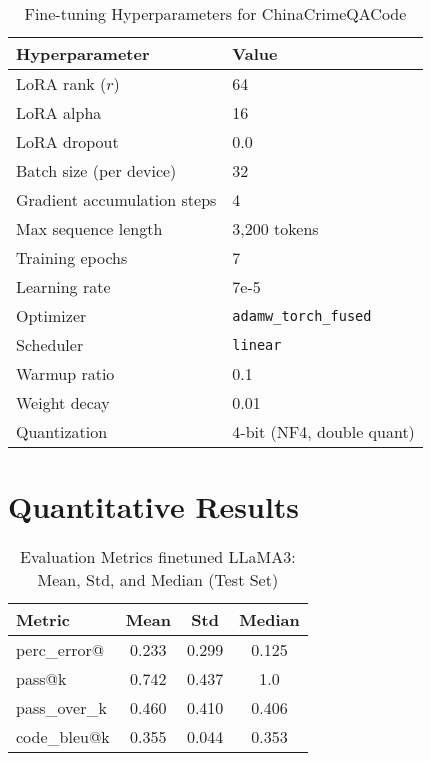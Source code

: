 \begin{table}[H]
\centering
\caption{Fine-tuning Hyperparameters for ChinaCrimeQACode}
\label{tab:hyperparameters}
\begin{tabular}{ll}
\toprule
\textbf{Hyperparameter} & \textbf{Value} \\
\midrule
LoRA rank ($r$) & 64 \\
LoRA alpha & 16 \\
LoRA dropout & 0.0 \\
Batch size (per device) & 32 \\
Gradient accumulation steps & 4 \\
Max sequence length & 3,200 tokens \\
Training epochs & 7 \\
Learning rate & 7e-5 \\
Optimizer & \texttt{adamw\_torch\_fused} \\
Scheduler & \texttt{linear} \\
Warmup ratio & 0.1 \\
Weight decay & 0.01 \\
Quantization & 4-bit (NF4, double quant) \\
\bottomrule
\end{tabular}
\end{table}

\section{Quantitative Results}


\begin{table}[h!]
\centering
\caption{Evaluation Metrics finetuned LLaMA3: Mean, Std, and Median (Test Set)}
{%
\begin{tabular}{l|ccc}
\toprule
\textbf{Metric} & \textbf{Mean} & \textbf{Std} & \textbf{Median} \\
\midrule
perc\_error@ & 0.233 & 0.299 & 0.125 \\
pass@k    & 0.742 & 0.437 & 1.0   \\
pass\_over\_k  & 0.460 & 0.410 & 0.406 \\
code\_bleu@k  & 0.355 & 0.044 & 0.353 \\
\bottomrule
\end{tabular}
}
\label{tab:metrics_generated}
\end{table}

